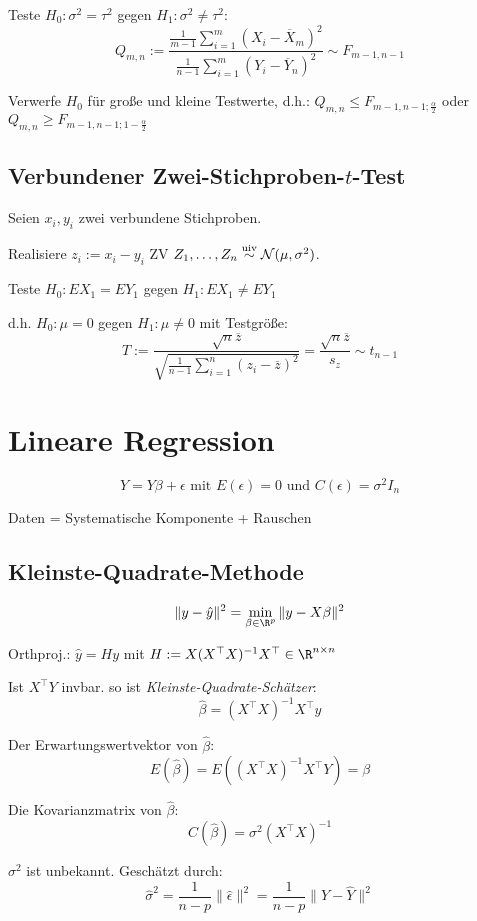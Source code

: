 Teste \(H_0 : \sigma^2 = \tau^2\) gegen \(H_1 : \sigma^2 \neq \tau^2\):
\[ Q_{m,n} := \frac{\frac{1}{m-1}\sum_{i=1}^m(X_i-\overline X_m)^2}{\frac{1}{n-1}\sum_{i=1}^m(Y_i-\overline Y_n)^2} \sim F_{m-1,n-1} \]

Verwerfe \(H_0\) für große und kleine Testwerte, d.h.: \(Q_{m,n} \leq F_{m-1,n-1;\frac{\alpha}{2}}\) oder \(Q_{m,n} \geq F_{m-1,n-1;1-\frac{\alpha}{2}}\)

\subsection*{Verbundener Zwei-Stichproben-\(t\)-Test}

Seien \(x_i, y_i\) zwei verbundene Stichproben.

Realisiere \(z_i := x_i - y_i\) ZV \(Z_1,\dots,Z_n \stackrel{\text{uiv}}{\sim} \mathcal{N}(\mu,\sigma^2)\).

Teste \(H_0 : EX_1 = EY_1\) gegen \(H_1 : EX_1 \neq EY_1\)

d.h. \(H_0 : \mu = 0\) gegen \(H_1 : \mu \neq 0\) mit Testgröße:
\[ T := \frac{\sqrt{n} \overline z}{\sqrt{\frac{1}{n-1} \sum_{i=1}^n(z_i-\overline z)^2}} = \frac{\sqrt{n}\overline z}{s_z} \sim t_{n-1} \]

\section*{Lineare Regression}

\[ Y = Y\beta + \epsilon \text{ mit } E(\epsilon) = 0 \text{ und } C(\epsilon)=\sigma^2 I_n\]

Daten = Systematische Komponente + Rauschen

\subsection*{Kleinste-Quadrate-Methode}

\[ \| y - \hat y \|^2 = \min_{\beta \in \R^p} \|y - X\beta\|^2 \]

Orthproj.: \(\hat y = Hy\) mit \(H := X(X^\top X)^{-1} X^\top \in \R^{n \times n}\)

Ist \(X^\top Y\) invbar. so ist \emph{Kleinste-Quadrate-Schätzer}:
\[ \hat\beta = (X^\top X)^{-1} X^\top y \]

Der Erwartungswertvektor von \(\hat\beta\):
\[ E(\hat\beta) = E((X^\top X)^{-1} X^\top Y) = \beta \]

Die Kovarianzmatrix von \(\hat\beta\):
\[ C(\hat\beta) = \sigma^2 (X^\top X)^{-1} \]

\(\sigma^2\) ist unbekannt. Geschätzt durch:
\[ \hat\sigma^2 = \frac{1}{n-p} \|\hat\epsilon\|^2 = \frac{1}{n-p} \|Y-\hat Y\|^2 \]

